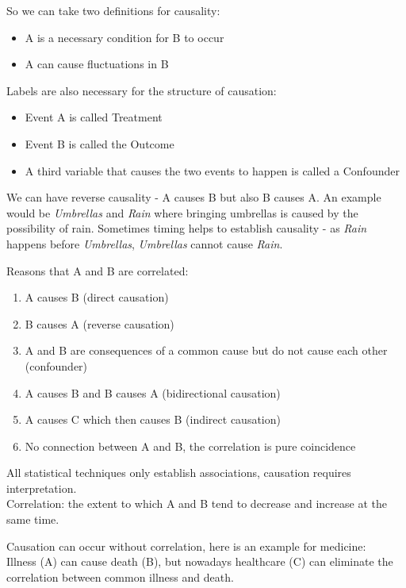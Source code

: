 \documentclass[12pt, letterpaper]{article}
\begin{document}
{\vspace{10pt}
\noindent So we can take two definitions for causality:
\begin{itemize}
	\item A is a necessary condition for B to occur
	\item A can cause fluctuations in B
\end{itemize}
Labels are also necessary for the structure of causation:
\begin{itemize}
	\item Event A is called Treatment
	\item Event B is called the Outcome
	\item A third variable that causes the two events to happen is called a Confounder
\end{itemize}

\noindent We can have reverse causality - A causes B but also B causes A. An example would be \textit{Umbrellas} and \textit{Rain} where bringing umbrellas is caused by the possibility of rain. Sometimes timing helps to establish causality - as \textit{Rain} happens before \textit{Umbrellas}, \textit{Umbrellas} cannot cause \textit{Rain}.

\vspace{10pt}
\noindent Reasons that A and B are correlated:
\begin{enumerate}
	\item A causes B (direct causation)
	\item B causes A (reverse causation)
	\item A and B are consequences of a common cause but do not cause each other (confounder)
	\item A causes B and B causes A (bidirectional causation)
	\item A causes C which then causes B (indirect causation)
	\item No connection between A and B, the correlation is pure coincidence
\end{enumerate}
All statistical techniques only establish associations, causation requires interpretation.\\
Correlation: the extent to which A and B tend to decrease and increase at the same time.

\vspace{10pt}
\noindent Causation can occur without correlation, here is an example for medicine:\\
Illness (A) can cause death (B), but nowadays healthcare (C) can eliminate the correlation between common illness and death.

}
\end{document}
